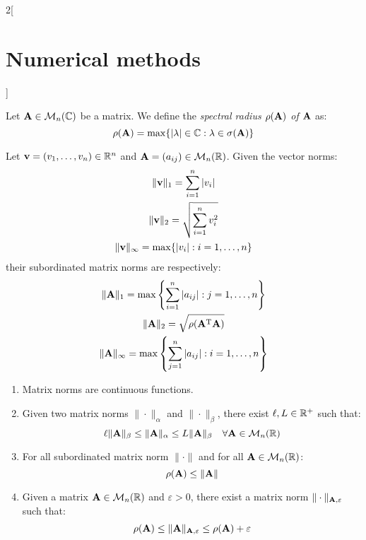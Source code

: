 \documentclass[../../../main.tex]{subfiles}
\begin{document}
\begin{multicols}{2}[\section{Numerical methods}]
\begin{definition}
    \end{definition}
    \begin{definition}
        Let $\boldsymbol{\mathrm{A}}\in\mathcal{M}_n(\mathbb{C})$ be a matrix. We define the \textit{spectral radius $\rho(\boldsymbol{\mathrm{A}})$ of $\boldsymbol{\mathrm{A}}$} as: $$\rho(\boldsymbol{\mathrm{A}})=\max\{|\lambda|\in\mathbb{C}:\lambda\in\sigma(\boldsymbol{\mathrm{A}})\}$$
    \end{definition}
    \begin{prop}
        Let $\boldsymbol{\mathrm{v}}=(v_1,\ldots,v_n)\in\mathbb{R}^n$ and $\boldsymbol{\mathrm{A}}=(a_{ij})\in\mathcal{M}_n(\mathbb{R})$. Given the vector norms:
        \begin{gather*}
            \|\boldsymbol{\mathrm{v}}\|_1=\sum_{i=1}^n|v_i|\\
            \|\boldsymbol{\mathrm{v}}\|_2=\sqrt{\sum_{i=1}^nv_i^2}\\
            \|\boldsymbol{\mathrm{v}}\|_\infty=\max\{|v_i|:i=1,\ldots,n\}
        \end{gather*}
        their subordinated matrix norms are respectively:
        \begin{gather*}
            \|\boldsymbol{\mathrm{A}}\|_1=\max\left\{\sum_{i=1}^n|a_{ij}|:j=1,\ldots,n\right\}\\
            \|\boldsymbol{\mathrm{A}}\|_2=\sqrt{\rho(\vb{A}^{\mathrm{T}}\boldsymbol{\mathrm{A}})}\\
            \|\boldsymbol{\mathrm{A}}\|_\infty=\max\left\{\sum_{j=1}^n|a_{ij}|:i=1,\ldots,n\right\}
        \end{gather*}
    \end{prop}
    \begin{prop}
        \hfill
        \begin{enumerate}
            \item Matrix norms are continuous functions.
            \item Given two matrix norms $\|\cdot\|_\alpha$ and $\|\cdot\|_\beta$, there exist $\ell, L\in\mathbb{R}^+$ such that: $$\ell \|\boldsymbol{\mathrm{A}}\|_\beta\leq\|\boldsymbol{\mathrm{A}}\|_\alpha\leq L\|\boldsymbol{\mathrm{A}}\|_\beta\quad\forall\boldsymbol{\mathrm{A}}\in\mathcal{M}_n(\mathbb{R})$$
            \item For all subordinated matrix norm $\|\cdot\|$ and for all $\boldsymbol{\mathrm{A}}\in\mathcal{M}_n(\mathbb{R})$: $$\rho(\boldsymbol{\mathrm{A}})\leq\|\boldsymbol{\mathrm{A}}\|$$
            \item Given a matrix $\boldsymbol{\mathrm{A}}\in\mathcal{M}_n(\mathbb{R})$ and $\varepsilon>0$, there exist a matrix norm $\|\cdot\|_{\boldsymbol{\mathrm{A}},\varepsilon}$ such that: $$\rho(\boldsymbol{\mathrm{A}})\leq\|\boldsymbol{\mathrm{A}}\|_{\boldsymbol{\mathrm{A}},\varepsilon}\leq\rho(\boldsymbol{\mathrm{A}})+\varepsilon$$

\end{enumerate}
\end{prop}
\end{multicols}
\end{document}
